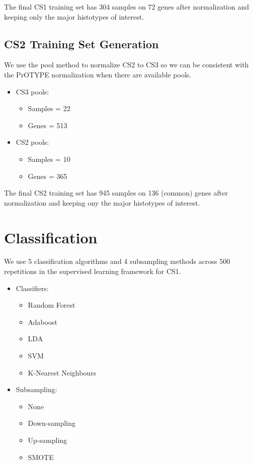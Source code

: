 \documentclass[
]{report}
\providecommand{\tightlist}{%
  \setlength{\itemsep}{0pt}\setlength{\parskip}{0pt}}
\begin{document}
The final CS1 training set has 304 samples on 72 genes after normalization and keeping only the major histotypes of interest.

\hypertarget{cs2-training-set-generation}{%
\subsection{CS2 Training Set Generation}\label{cs2-training-set-generation}}

We use the pool method to normalize CS2 to CS3 so we can be consistent with the PrOTYPE normalization when there are available pools.

\begin{itemize}
\tightlist
\item
  CS3 pools:

  \begin{itemize}
  \tightlist
  \item
    Samples = 22
  \item
    Genes = 513
  \end{itemize}
\item
  CS2 pools:

  \begin{itemize}
  \tightlist
  \item
    Samples = 10
  \item
    Genes = 365
  \end{itemize}
\end{itemize}

The final CS2 training set has 945 samples on 136 (common) genes after normalization
and keeping ony the major histotypes of interest.

\hypertarget{classification}{%
\section{Classification}\label{classification}}

We use 5 classification algorithms and 4 subsampling methods across 500 repetitions in the supervised learning framework for CS1.

\begin{itemize}
\tightlist
\item
  Classifiers:

  \begin{itemize}
  \tightlist
  \item
    Random Forest
  \item
    Adaboost
  \item
    LDA
  \item
    SVM
  \item
    K-Nearest Neighbours
  \end{itemize}
\item
  Subsampling:

  \begin{itemize}
  \tightlist
  \item
    None
  \item
    Down-sampling
  \item
    Up-sampling
  \item
    SMOTE
  \end{itemize}
\end{itemize}
\end{document}
